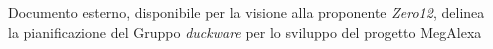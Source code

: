 Documento esterno, disponibile per la visione alla proponente \emph{Zero12}, delinea\\ la pianificazione del Gruppo \emph{duckware} per lo sviluppo del progetto MegAlexa
